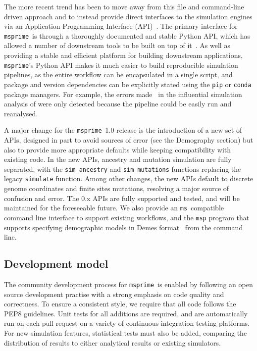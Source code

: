 \documentclass{article}
\newcommand{\msprime}[0]{\texttt{msprime}}
\newcommand{\ms}[0]{\texttt{ms}}
\begin{document}
The more recent trend has been to move away from this file and command-line
driven approach and to instead provide direct interfaces to the simulation
engines via an Application Programming Interface (API)~\citep[e.g.][]{
thornton2014cpp,kelleher2016efficient,becheler2019quetzal,haller2019slim}.
The primary interface for \msprime\ is through a thoroughly documented and
stable Python
API, which has allowed a number of downstream tools to be built on top of
it~\citep{terhorst2017robust,chan2018likelihood,spence2019inference,
adrion2020community,adrion2020predicting, kamm2020efficiently,
mckenzie2020ipcoal, montinaro2020revisiting,
de2021geonomics,rivera2021simulation}.
As well as providing a stable and efficient platform for building
downstream applications, \msprime's Python API makes it much easier to
build reproducible simulation pipelines, as the entire workflow can
be encapsulated in a single script, and package and version
dependencies can be explicitly stated using the \texttt{pip}
or \texttt{conda} package managers.
For example, the errors made~\citep{ragsdale2020lessons,martin2020erratum}
in the influential simulation analysis of
\cite{martin2017human} were only detected because the pipeline
could be easily run and reanalysed.

A major change for the \msprime\ 1.0 release is the introduction of a new set of APIs,
designed in part to avoid sources of error (see the Demography section) but
also to provide more appropriate defaults while keeping compatibility with
existing code. In the new APIs, ancestry and mutation simulation are fully
separated, with the \texttt{sim\_ancestry} and \texttt{sim\_mutations}
functions replacing the legacy \texttt{simulate} function. Among other changes,
the new APIs default to discrete genome coordinates and finite sites mutations,
resolving a major source of confusion and error. The 0.x APIs are fully
supported and tested, and will be maintained for the foreseeable future.
We also provide an \ms\ compatible
command line interface to support existing workflows, and the
\texttt{msp} program that supports specifying demographic models in
Demes format~\citep{gower2021demes} from the command line.


\subsection*{Development model}
The community development process for \msprime\ is enabled by following an
open source development practise with a strong emphasis on code quality
and correctness. To ensure a consistent style, we require that all code
follows the PEP8 guidelines. Unit tests for all additions are required, and
are automatically run on each pull request on a variety of continuous
integration testing platforms. For new simulation features, statistical tests
must also be added, comparing the distribution of results to either analytical
results or existing simulators.
\end{document}

